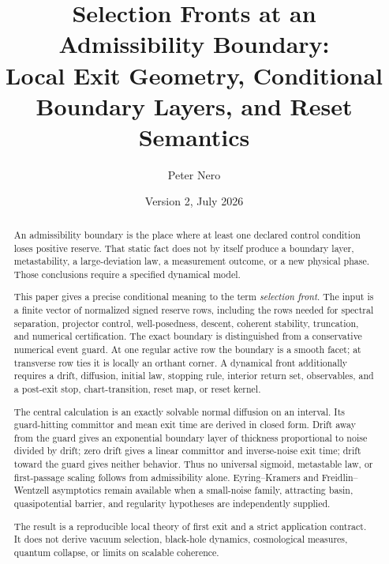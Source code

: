 \documentclass[11pt]{article}
\title{\vspace{-1em}
Selection Fronts at an Admissibility Boundary:\\[0.25em]
\large Local Exit Geometry, Conditional Boundary Layers, and Reset Semantics}
\author{Peter Nero}
\date{Version 2, July 2026}
\theoremstyle{definition}
\theoremstyle{remark}
\begin{document}
\maketitle

\begin{abstract}
An admissibility boundary is the place where at least one declared control
condition loses positive reserve.  That static fact does not by itself
produce a boundary layer, metastability, a large-deviation law, a
measurement outcome, or a new physical phase.  Those conclusions require a
specified dynamical model.

This paper gives a precise conditional meaning to the term
\emph{selection front}.  The input is a finite vector of normalized signed
reserve rows, including the rows needed for spectral separation,
projector control, well-posedness, descent, coherent stability, truncation,
and numerical certification.  The exact boundary is distinguished from a
conservative numerical event guard.  At one regular active row the boundary
is a smooth facet; at transverse row ties it is locally an orthant corner.
A dynamical front additionally requires a drift, diffusion, initial law,
stopping rule, interior return set, observables, and a post-exit stop,
chart-transition, reset map, or reset kernel.

The central calculation is an exactly solvable normal diffusion on an
interval.  Its guard-hitting committor and mean exit time are derived in
closed form.  Drift away from the guard gives an exponential boundary
layer of thickness proportional to noise divided by drift; zero drift
gives a linear committor and inverse-noise exit time; drift toward the guard
gives neither behavior.  Thus no universal sigmoid, metastable law, or
first-passage scaling follows from admissibility alone.  Eyring--Kramers
and Freidlin--Wentzell asymptotics remain available when a small-noise
family, attracting basin, quasipotential barrier, and regularity hypotheses
are independently supplied.

The result is a reproducible local theory of first exit and a strict
application contract.  It does not derive vacuum selection, black-hole
dynamics, cosmological measures, quantum collapse, or limits on scalable
coherence.
\end{abstract}
\end{document}
